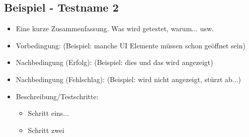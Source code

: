 \documentclass[qualitaetssicherung.tex]{subfiles}
\begin{document}
	\subsection{Beispiel - Testname 2}
		\begin{itemize}
			\item
			Eine kurze Zusammenfassung. Was wird getestet, warum... usw.
			\item
			Vorbedingung: (Beispiel: manche UI Elemente müssen schon geöffnet sein)
			\item
			Nachbedingung (Erfolg): (Beispiel: dies und das wird angezeigt)
			\item
			Nachbedingung (Fehlschlag): (Beispiel: wird nicht angezeigt, stürzt ab...)
			\item
			Beschreibung/Testschritte:
			\begin{itemize}
				\item
				Schritt eins...
				\item
				Schritt zwei
			\end{itemize}
		\end{itemize}
\end{document}
